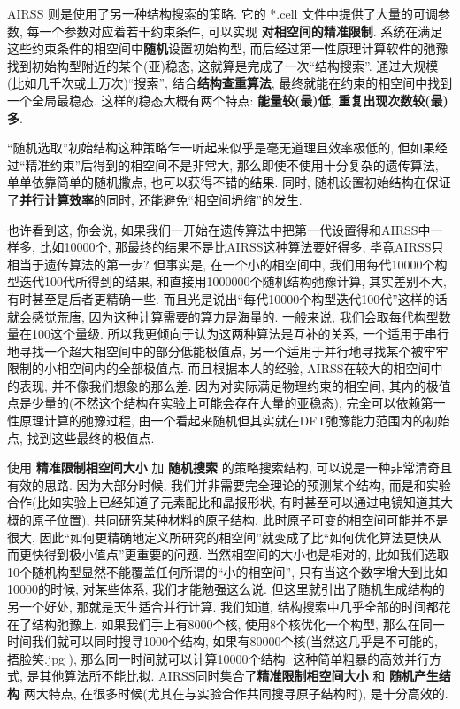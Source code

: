 \documentclass[a4paper, 10pt]{article}
\begin{document}
AIRSS 则是使用了另一种结构搜索的策略. 它的 *.cell 文件中提供了大量的可调参数, 每一个参数对应着若干约束条件, 可以实现 \textbf{对相空间的精准限制}. 系统在满足这些约束条件的相空间中\textbf{随机}设置初始构型, 而后经过第一性原理计算软件的弛豫找到初始构型附近的某个(亚)稳态, 这就算是完成了一次``结构搜索''. 通过大规模(比如几千次或上万次)``搜索'', 结合\textbf{结构查重算法}, 最终就能在约束的相空间中找到一个全局最稳态. 这样的稳态大概有两个特点: \textbf{能量较(最)低}, \textbf{重复出现次数较(最)多}.

``随机选取''初始结构这种策略乍一听起来似乎是毫无道理且效率极低的, 但如果经过``精准约束''后得到的相空间不是非常大, 那么即使不使用十分复杂的遗传算法, 单单依靠简单的随机撒点, 也可以获得不错的结果. 同时, 随机设置初始结构在保证了\textbf{并行计算效率}的同时, 还能避免``相空间坍缩''的发生. 

也许看到这, 你会说, 如果我们一开始在遗传算法中把第一代设置得和AIRSS中一样多, 比如10000个, 那最终的结果不是比AIRSS这种算法要好得多, 毕竟AIRSS只相当于遗传算法的第一步? 但事实是, 在一个小的相空间中, 我们用每代10000个构型迭代100代所得到的结果, 和直接用1000000个随机结构弛豫计算, 其实差别不大, 有时甚至是后者更精确一些. 而且光是说出``每代10000个构型迭代100代''这样的话就会感觉荒唐, 因为这种计算需要的算力是海量的. 一般来说, 我们会取每代构型数量在100这个量级. 所以我更倾向于认为这两种算法是互补的关系, 一个适用于串行地寻找一个超大相空间中的部分低能极值点, 另一个适用于并行地寻找某个被牢牢限制的小相空间内的全部极值点. 而且根据本人的经验, AIRSS在较大的相空间中的表现, 并不像我们想象的那么差. 因为对实际满足物理约束的相空间, 其内的极值点是少量的(不然这个结构在实验上可能会存在大量的亚稳态), 完全可以依赖第一性原理计算的弛豫过程, 由一个看起来随机但其实就在DFT弛豫能力范围内的初始点, 找到这些最终的极值点.

使用 \textbf{精准限制相空间大小} 加 \textbf{随机搜索} 的策略搜索结构, 可以说是一种非常清奇且有效的思路. 因为大部分时候, 我们并非需要完全理论的预测某个结构, 而是和实验合作(比如实验上已经知道了元素配比和晶报形状, 有时甚至可以通过电镜知道其大概的原子位置), 共同研究某种材料的原子结构. 此时原子可变的相空间可能并不是很大, 因此``如何更精确地定义所研究的相空间''就变成了比``如何优化算法更快从而更快得到极小值点''更重要的问题. 当然相空间的大小也是相对的, 比如我们选取10个随机构型显然不能覆盖任何所谓的``小的相空间'', 只有当这个数字增大到比如10000的时候, 对某些体系, 我们才能勉强这么说. 但这里就引出了随机生成结构的另一个好处, 那就是天生适合并行计算. 我们知道, 结构搜索中几乎全部的时间都花在了结构弛豫上. 如果我们手上有8000个核, 使用8个核优化一个构型, 那么在同一时间我们就可以同时搜寻1000个结构, 如果有80000个核(当然这几乎是不可能的, 捂脸笑.jpg ), 那么同一时间就可以计算10000个结构. 这种简单粗暴的高效并行方式, 是其他算法所不能比拟. AIRSS同时集合了\textbf{精准限制相空间大小} 和 \textbf{随机产生结构} 两大特点, 在很多时候(尤其在与实验合作共同搜寻原子结构时), 是十分高效的.
\end{document}
